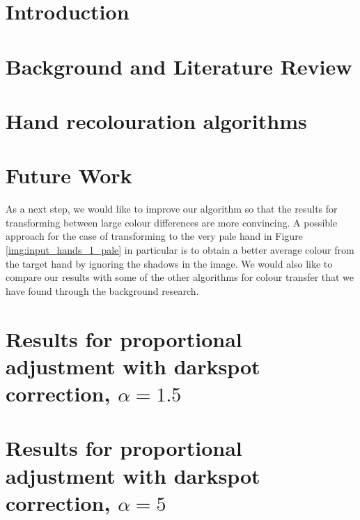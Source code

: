 \documentclass[12pt, a4paper]{article}
\begin{document}


\renewcommand{\thepage}{\roman{page}}%
\tableofcontents
\pagebreak

\listoffigures
\listoftables
\pagebreak

\renewcommand{\nomname}{List of Symbols}
\printnomenclature
\pagebreak

\renewcommand{\thepage}{\arabic{page}}%

\section{Introduction}

\pagebreak

\section{Background and Literature Review}

\pagebreak

\section{Hand recolouration algorithms}

\pagebreak

\section{Future Work}
As a next step, we would like to improve our algorithm so that the results for transforming between large colour differences are more convincing. A possible approach for the case of transforming to the very pale hand in Figure \ref{img:input_hands_1_pale} in particular is to obtain a better average colour from the target hand by ignoring the shadows in the image. We would also like to compare our results with some of the other algorithms for colour transfer that we have found through the background research.
\pagebreak



\pagebreak

\appendix
\section{Results for proportional adjustment with darkspot correction, $\alpha = 1.5$}\label{app:prop_corr_ave_a1p5}


\section{Results for proportional adjustment with darkspot correction, $\alpha = 5$}\label{app:prop_corr_ave_a5}

\end{document}
